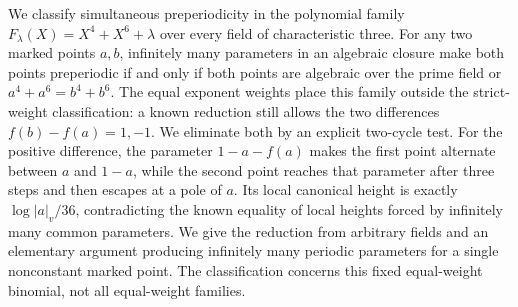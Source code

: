 We classify simultaneous preperiodicity in the polynomial family
$F_\lambda(X)=X^4+X^6+\lambda$ over every field of characteristic three.
For any two marked points $a,b$, infinitely many parameters in an
algebraic closure make both points preperiodic if and only if both
points are algebraic over the prime field or $a^4+a^6=b^4+b^6$.
The equal exponent weights place this family outside the strict-weight
classification: a known reduction still allows the two differences
$f(b)-f(a)=1,-1$. We eliminate both by an explicit two-cycle test.
For the positive difference, the parameter $1-a-f(a)$ makes the first
point alternate between $a$ and $1-a$, while the second point reaches
that parameter after three steps and then escapes at a pole of $a$.
Its local canonical height is exactly $\log|a|_v/36$, contradicting
the known equality of local heights forced by infinitely many common
parameters. We give the reduction from arbitrary fields and an
elementary argument producing infinitely many periodic parameters for
a single nonconstant marked point. The classification concerns this
fixed equal-weight binomial, not all equal-weight families.

